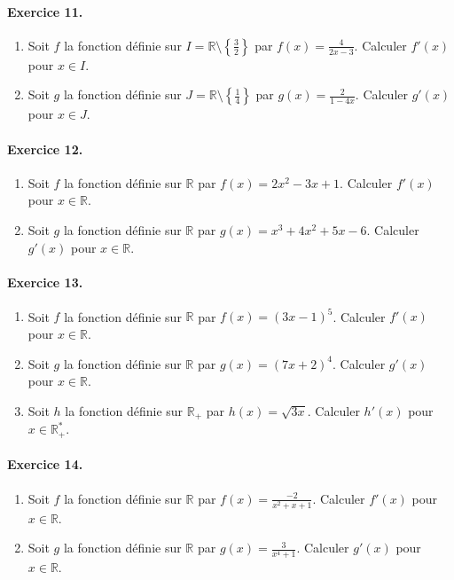 \documentclass[11pt]{article}
\begin{document}
\paragraph{Exercice 11.}
\begin{enumerate}
  \item Soit $f$ la fonction définie sur $I=\mathbb{R}\setminus\left\{
      \frac{3}{2}\right\}$ par $f(x)=\frac{4}{2x-3}$. Calculer $f'(x)$ pour
      $x\in I$.
  \item Soit $g$ la fonction définie sur $J=\mathbb{R}\setminus\left\{
      \frac{1}{4}\right\}$ par $g(x)=\frac{2}{1-4x}$. Calculer $g'(x)$ pour
      $x\in J$.
\end{enumerate}

\paragraph{Exercice 12.}
\begin{enumerate}
  \item Soit $f$ la fonction définie sur $\mathbb{R}$ par $f(x)=2x^2-3x+1$.
    Calculer $f'(x)$ pour $x\in\mathbb{R}$.
  \item Soit $g$ la fonction définie sur $\mathbb{R}$ par $g(x)=x^3+4x^2+5x-6$.
    Calculer $g'(x)$ pour $x\in\mathbb{R}$.
\end{enumerate}

\paragraph{Exercice 13.}
\begin{enumerate}
  \item Soit $f$ la fonction définie sur $\mathbb{R}$ par $f(x)=(3x-1)^5$.
    Calculer $f'(x)$ pour $x\in\mathbb{R}$.
  \item Soit $g$ la fonction définie sur $\mathbb{R}$ par $g(x)=(7x+2)^4$.
    Calculer $g'(x)$ pour $x\in\mathbb{R}$.
  \item Soit $h$ la fonction définie sur $\mathbb{R_+}$ par
    $h(x)=\sqrt{3x}$.
    Calculer $h'(x)$ pour $x\in\mathbb{R_+^*}$.
\end{enumerate}

\paragraph{Exercice 14.}
\begin{enumerate}
  \item Soit $f$ la fonction définie sur $\mathbb{R}$ par
    $f(x)=\frac{-2}{x^2+x+1}$. Calculer $f'(x)$ pour $x\in\mathbb{R}$.
  \item Soit $g$ la fonction définie sur $\mathbb{R}$ par
    $g(x)=\frac{3}{x^4+1}$. Calculer $g'(x)$ pour $x\in\mathbb{R}$.
\end{enumerate}
\end{document}
